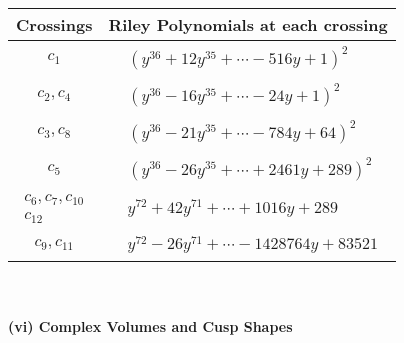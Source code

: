 \documentclass[1p]{elsarticle_modified}
\theoremstyle{definition}
\begin{document}
\begin{tabular}{m{50pt}|m{274pt}}
Crossings & \hspace{64pt}Riley Polynomials at each crossing \\
\hline $$\begin{aligned}c_{1}\end{aligned}$$&$\begin{aligned}
&(y^{36}+12 y^{35}+\cdots-516 y+1)^{2}
\end{aligned}$\\
\hline $$\begin{aligned}c_{2},c_{4}\end{aligned}$$&$\begin{aligned}
&(y^{36}-16 y^{35}+\cdots-24 y+1)^{2}
\end{aligned}$\\
\hline $$\begin{aligned}c_{3},c_{8}\end{aligned}$$&$\begin{aligned}
&(y^{36}-21 y^{35}+\cdots-784 y+64)^{2}
\end{aligned}$\\
\hline $$\begin{aligned}c_{5}\end{aligned}$$&$\begin{aligned}
&(y^{36}-26 y^{35}+\cdots+2461 y+289)^{2}
\end{aligned}$\\
\hline $$\begin{aligned}c_{6},c_{7},c_{10}\\c_{12}\end{aligned}$$&$\begin{aligned}
&y^{72}+42 y^{71}+\cdots+1016 y+289
\end{aligned}$\\
\hline $$\begin{aligned}c_{9},c_{11}\end{aligned}$$&$\begin{aligned}
&y^{72}-26 y^{71}+\cdots-1428764 y+83521
\end{aligned}$\\
\hline
\end{tabular}\\~\\
\newpage\flushleft \textbf{(vi) Complex Volumes and Cusp Shapes}
\end{document}
